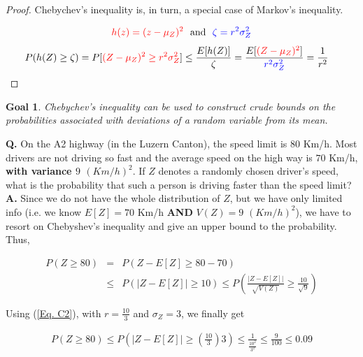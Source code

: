 \documentclass[notes=show,smaller,handout]{beamer}\usepackage[]{graphicx}\usepackage[]{color}
\newtheorem{goal}{Goal}[section]
\renewcommand{\Pr}{P}
\begin{document}
\begin{frame}{\secname}

  \begin{proof}
  Chebychev's inequality is, in turn, a special case of Markov's inequality.

  $${\color{red} h(z)=(z-\mu_Z)^2} \ \text{ and } \ {\color{blue}\zeta=r^2\sigma_Z^2}$$
  \begin{align*}
  \Pr(h(Z)\geq \zeta) = \Pr[{\color{red}(Z-\mu_Z)^2 \geq r^2\sigma_Z^2}]
  &\leq \frac{E[h(Z)]}{\zeta} = \frac{E[{\color{red}(Z-\mu_Z)^2}]}{{\color{blue}r^2\sigma_Z^2}} = \frac{1}{r^2}
  \end{align*}
  \end{proof}

  \pause

  \begin{goal}
  Chebychev's inequality can be used to construct crude bounds on the probabilities associated with deviations of a random variable from its mean.
  \end{goal}

\end{frame}



\begin{frame}{\secname}
  \begin{example}
  \begin{footnotesize}
  \textbf{Q.} On the A2 highway (in the Luzern Canton), the speed limit is $80$ Km/h. Most drivers are not driving so fast and the average speed on the high way is $70$ Km/h, \textbf{with variance $9$ $(Km/h)^2$}.
  If $Z$ denotes a randomly chosen driver's speed, what is the probability that such a person is driving faster than the speed limit? \\
  \medskip
  \pause
  \textbf{A.} Since we do not have the whole distribution of $Z$, but we have only limited info (i.e. we know $E[Z]=70$ Km/h \textbf{AND} $V(Z)=9$ $(Km/h)^2$), we have to resort on Chebyshev's inequality and give an upper bound to the probability. Thus,

  \begin{eqnarray*}
  P( Z \geq 80) &=& P( Z - E[Z]\geq 80 - 70) \\ &\leq& P(\vert Z-E[Z] \vert \geq 10) \leq  P\left( \frac{\vert Z-E[Z] \vert }{\sqrt{V(Z)}}\geq \frac{10}{\sqrt{9}}\right)
  \end{eqnarray*}


  Using (\ref{Eq. C2}), with $r=\frac{10}{3}$ and $\sigma_Z= 3$, we finally get

  \begin{eqnarray*}
  P( Z \geq 80) \leq P\left(\Big\vert Z-E[Z] \Big\vert \geq \left(\frac{10}{3}\right) {3}\right) \leq \frac{1}{\frac{10^2}{3^2}} \leq \frac{9}{100} \leq 0.09
  \end{eqnarray*}

  \end{footnotesize}
  \end{example}
\end{frame}
\end{document}
